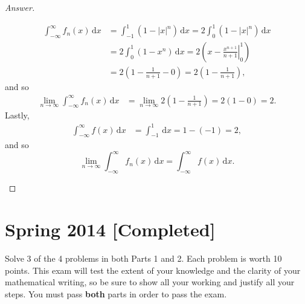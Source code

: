 \documentclass[12pt]{article}
\newcommand\paren[1]{\left( #1 \right)}
\theoremstyle{definition}
\begin{document}
\begin{proof}[Answer]
\begin{enumerate}[a)]
        \begin{align*}
            \int_{-\infty}^{\infty} f_n(x) \, \mathrm{d}x & = \int_{-1}^1 \paren{ 1 - |x|^n } \, \mathrm{d}x = 2 \int_0^1 \paren{ 1 - |x|^n } \, \mathrm{d}x \\
            & = 2 \int_0^1 \paren{ 1 - x^n } \, \mathrm{d}x = 2 \paren{ \left. x - \frac{x^{n+1}}{n+1} \right|_{0}^{1} } \\
            & = 2 \paren{ 1 - \frac{1}{n+1} - 0 } = 2 \paren{ 1 - \frac{1}{n+1} },
        \end{align*}
        and so 
        \begin{align*}
            \lim\limits_{n \to \infty} \int_{-\infty}^{\infty} f_n(x) \, \mathrm{d}x & = \lim\limits_{n \to \infty} 2 \paren{ 1 - \frac{1}{n+1} } = 2 ( 1 - 0 ) = 2.
        \end{align*}
        Lastly,
        \begin{align*}
            \int_{-\infty}^{\infty} f(x) \, \mathrm{d}x & = \int_{-1}^{1} \, \mathrm{d}x = 1 - (-1) = 2,
        \end{align*}
        and so 
        \[
            \lim\limits_{n \to \infty} \int_{-\infty}^{\infty} f_n(x) \, \mathrm{d}x = \int_{-\infty}^{\infty} f(x) \, \mathrm{d}x.
        \]
    \end{enumerate}
\end{proof}
\newpage
\section{Spring 2014 [Completed]}
Solve 3 of the 4 problems in both Parts 1 and 2. Each problem is worth 10 points. This exam will test the extent of your knowledge and the clarity of your mathematical writing, so be sure to show all your working and justify all your steps. You must pass \textbf{both} parts in order to pass the exam. 
\end{document}
